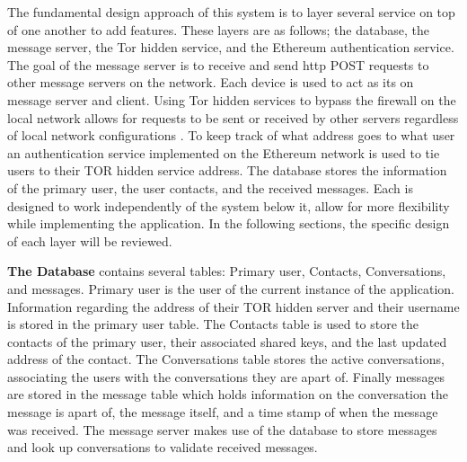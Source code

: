 \documentclass[../main/main.tex]{subfiles}
\begin{document}
	
The fundamental design approach of this system is to layer several service on top of one another to add features. 
These layers are as follows; the database, the message server, the Tor hidden service, and the Ethereum authentication service. 
The goal of the message server is to receive and send http POST requests to other message servers on the network. 
Each device is used to act as its on message server and client. 
Using Tor hidden services to bypass the firewall on the local network allows for requests to be sent or received by other servers regardless of local network configurations \cite{TCP}.
To keep track of what address goes to what user an authentication service implemented on the Ethereum network is used to tie users to their TOR hidden service address. 
The database stores the information of the primary user, the user contacts, and the received messages.
Each is designed to work independently of the system below it, allow for more flexibility while implementing the application. 
In the following sections, the specific design of each layer will be reviewed.

\textbf{The Database} contains several tables: Primary user, Contacts, Conversations, and messages. 
Primary user is the user of the current instance of the application. 
Information regarding the address of their TOR hidden server and their username is stored in the primary user table. 
The Contacts table is used to store the contacts of the primary user, their associated shared keys, and the last updated address of the contact. 
The Conversations table stores the active conversations, associating the users with the conversations they are apart of.
Finally messages are stored in the message table which holds information on the conversation the message is apart of, the message itself, and a time stamp of when the message was received. 
The message server makes use of the database to store messages and look up conversations to validate received messages.
\end{document}
